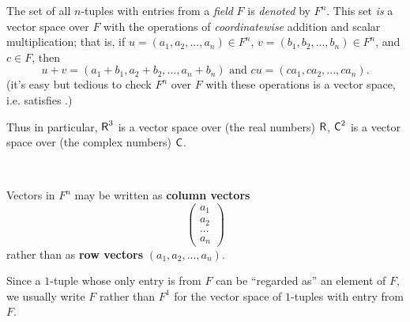 \begin{example} \label{example 1.2.1}
The set of all \(n\)-tuples with entries from a \emph{field} \(F\) is \emph{denoted} by \(F^n\).
This set \emph{is} a vector space over \(F\) with the operations of \emph{coordinatewise} addition and scalar multiplication;
that is, if \(u = (a_1, a_2, ..., a_n) \in F^n\), \(v = (b_1, b_2, ..., b_n) \in F^n\), and \(c \in F\), then
\[
    u + v = (a_1 + b_1, a_2 + b_2, ..., a_n + b_n) \text{ and } cu = (ca_1, ca_2, ..., ca_n).
\]
(it's easy but tedious to check \(F^n\) over \(F\) with these operations is a vector space, i.e. satisfies .)

Thus in particular, \(\textsf{R}^3\) is a vector space over (the real numbers) \(\textsf{R}\), \(\textsf{C}^2\) is a vector space over (the complex numbers) \(\textsf{C}\).
\end{example}

\begin{additional definition} \label{adef 1.2}\ 

 Vectors in \(F^n\) may be written as \textbf{column vectors}
\[
    \begin{pmatrix}
        a_1 \\
        a_2 \\
        ... \\
        a_n
    \end{pmatrix}
\]
rather than as \textbf{row vectors} \((a_1, a_2, ..., a_n)\).

 Since a \(1\)-tuple whose only entry is from \(F\) can be ``regarded as'' an element of \(F\), we usually write \(F\) rather than \(F^1\) for the vector space of \(1\)-tuples with entry from \(F\).
\end{additional definition}

